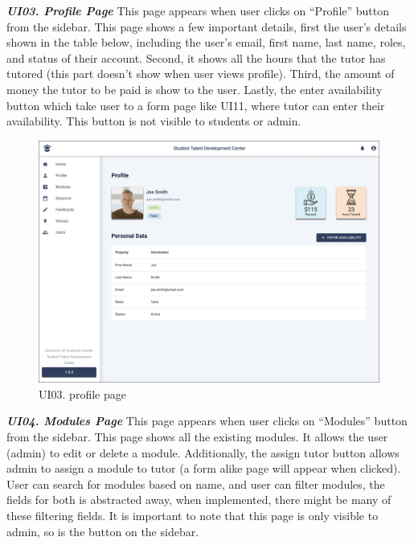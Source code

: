 \begin{justify}
    \noindent\textbf{\textit{UI03. Profile Page}}\newendline
    This page appears when user clicks on “Profile” button from the sidebar. This page shows a few important details, first the user’s details shown in the table below, including the user’s email, first name, last name, roles, and status of their account. Second, it shows all the hours that the tutor has tutored (this part doesn’t show when user views profile). Third, the amount of money the tutor to be paid is show to the user. Lastly, the enter availability button which take user to a form page like UI11, where tutor can enter their availability. This button is not visible to students or admin.\\

    \begin{figure}[H]
    \centerline{\includegraphics[width=150mm,scale=1]{figures/analysis_and_design/design/UI/3. Profile Page (UI03).png}}
    \caption{UI03. profile page}
    \label{UI03}
    \end{figure}
    \clearpage



    \noindent\textbf{\textit{UI04. Modules Page}}\newendline
   This page appears when user clicks on “Modules” button from the sidebar. This page shows all the existing modules. It allows the user (admin) to edit or delete a module. Additionally, the assign tutor button allows admin to assign a module to tutor (a form alike page will appear when clicked). User can search for modules based on name, and user can filter modules, the fields for both is abstracted away, when implemented, there might be many of these filtering fields. It is important to note that this page is only visible to admin, so is the button on the sidebar.\\


\end{justify}
